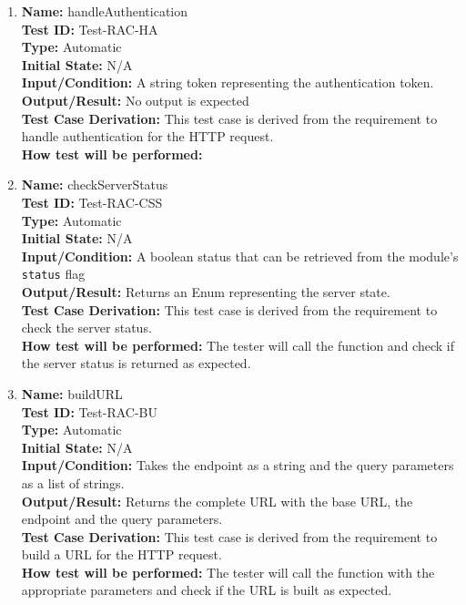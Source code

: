 \documentclass[12pt, titlepage]{article}
\begin{document}
\begin{enumerate}
  \item \textbf{Name:} handleAuthentication \label{itm:Test-RAC-HA} \\
        \textbf{Test ID:} Test-RAC-HA \\
        \textbf{Type:} Automatic \\
        \textbf{Initial State:} N/A \\
        \textbf{Input/Condition:} A string token representing the authentication token. \\
        \textbf{Output/Result:} No output is expected \\
        \textbf{Test Case Derivation:} This test case is derived from the requirement to handle authentication for the HTTP request. \\
        \textbf{How test will be performed:}

  \item \textbf{Name:} checkServerStatus \label{itm:Test-RAC-CSS} \\
        \textbf{Test ID:} Test-RAC-CSS \\
        \textbf{Type:} Automatic \\
        \textbf{Initial State:} N/A \\
        \textbf{Input/Condition:} A boolean status that can be retrieved from the module's \texttt{status} flag \\
        \textbf{Output/Result:} Returns an Enum representing the server state. \\
        \textbf{Test Case Derivation:} This test case is derived from the requirement to check the server status. \\
        \textbf{How test will be performed:} The tester will call the function and check if the server status is returned as expected. \\

  \item \textbf{Name:} buildURL \label{itm:Test-RAC-BU} \\
        \textbf{Test ID:} Test-RAC-BU \\
        \textbf{Type:} Automatic \\
        \textbf{Initial State:} N/A \\
        \textbf{Input/Condition:} Takes the endpoint as a string and the query parameters as a list of strings. \\
        \textbf{Output/Result:} Returns the complete URL with the base URL, the endpoint and the query parameters. \\
        \textbf{Test Case Derivation:} This test case is derived from the requirement to build a URL for the HTTP request. \\
        \textbf{How test will be performed:} The tester will call the function with the appropriate parameters and check if the URL is built as expected. \\


\end{enumerate}
\end{document}

